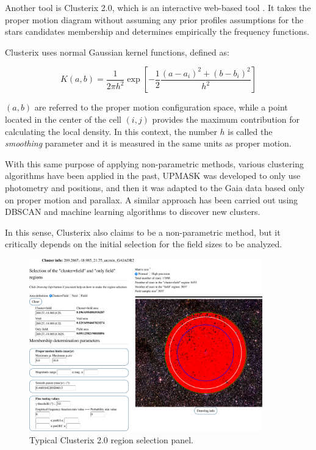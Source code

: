 \documentclass[11pt, a4paper, english]{book}
\begin{document}
Another tool is Clusterix 2.0, which is an interactive web-based tool \cite{balaguer2020clusterix}. It takes the proper motion diagram
without assuming any prior profiles assumptions for the stars candidates membership and determines empirically the frequency functions.

Clusterix uses normal Gaussian kernel functions, defined as:

\begin{equation}
  K(a, b) = \frac{1}{2 \pi h^{2}} \exp{ \left[ -\frac{1}{2}\frac{\left( a - a_{i} \right)^{2} + \left( b - b_{i} \right)^{2}}{ h^{2}} \right]}
\end{equation}

$(a, b)$ are referred to the proper motion configuration space, while a point located in the center of the cell $(i, j)$ provides the maximum
contribution for calculating the local density. In this context, the number $h$ is called the \emph{smoothing} parameter and it is measured in
the same units as proper motion.

With this same purpose of applying non-parametric methods, various clustering algorithms have been applied in the past, UPMASK \cite{krone2014upmask}
was developed to only use photometry and positions, and then it was adapted to the Gaia data \cite{cantat2018gaia} based only on proper motion and
parallax. A similar approach has been carried out using DBSCAN and machine learning algorithms to discover new clusters.

In this sense, Clusterix also claims to be a non-parametric method, but it critically depends on the initial selection for the field sizes to be analyzed.

\begin{figure}[htbp]
  \centering
  \includegraphics[width=0.9\textwidth]{../figures/clusterix/selection.pdf}
  \caption{Typical Clusterix 2.0 region selection panel.}
  \label{fig:clusterix_control_panel}
\end{figure}
\end{document}
